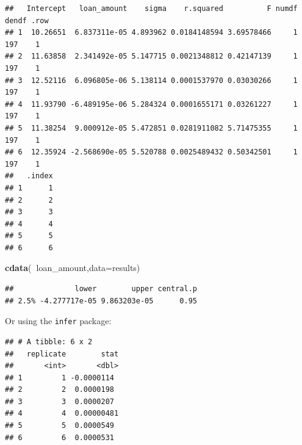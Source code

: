 \documentclass[
]{book}
\newenvironment{Shaded}{\begin{snugshade}}{\end{snugshade}}
\newcommand{\DataTypeTok}[1]{\textcolor[rgb]{0.13,0.29,0.53}{#1}}
\newcommand{\DecValTok}[1]{\textcolor[rgb]{0.00,0.00,0.81}{#1}}
\newcommand{\KeywordTok}[1]{\textcolor[rgb]{0.13,0.29,0.53}{\textbf{#1}}}
\newcommand{\NormalTok}[1]{#1}
\newcommand{\OperatorTok}[1]{\textcolor[rgb]{0.81,0.36,0.00}{\textbf{#1}}}
\newcommand{\StringTok}[1]{\textcolor[rgb]{0.31,0.60,0.02}{#1}}
\begin{document}
\begin{verbatim}
##   Intercept   loan_amount    sigma    r.squared          F numdf dendf .row
## 1  10.26651  6.837311e-05 4.893962 0.0184148594 3.69578466     1   197    1
## 2  11.63858  2.341492e-05 5.147715 0.0021348812 0.42147139     1   197    1
## 3  12.52116  6.096805e-06 5.138114 0.0001537970 0.03030266     1   197    1
## 4  11.93790 -6.489195e-06 5.284324 0.0001655171 0.03261227     1   197    1
## 5  11.38254  9.000912e-05 5.472851 0.0281911082 5.71475355     1   197    1
## 6  12.35924 -2.568690e-05 5.520788 0.0025489432 0.50342501     1   197    1
##   .index
## 1      1
## 2      2
## 3      3
## 4      4
## 5      5
## 6      6
\end{verbatim}

\begin{Shaded}
\begin{Highlighting}[]
\KeywordTok{cdata}\NormalTok{(}\OperatorTok{~}\NormalTok{loan_amount,}\DataTypeTok{data=}\NormalTok{results)}
\end{Highlighting}
\end{Shaded}

\begin{verbatim}
##              lower        upper central.p
## 2.5% -4.277717e-05 9.863203e-05      0.95
\end{verbatim}

Or using the \texttt{infer} package:

\begin{Shaded}
\end{Shaded}

\begin{verbatim}
## # A tibble: 6 x 2
##   replicate        stat
##       <int>       <dbl>
## 1         1 -0.0000114 
## 2         2  0.0000198 
## 3         3  0.0000207 
## 4         4  0.00000481
## 5         5  0.0000549 
## 6         6  0.0000531
\end{verbatim}
\end{document}
